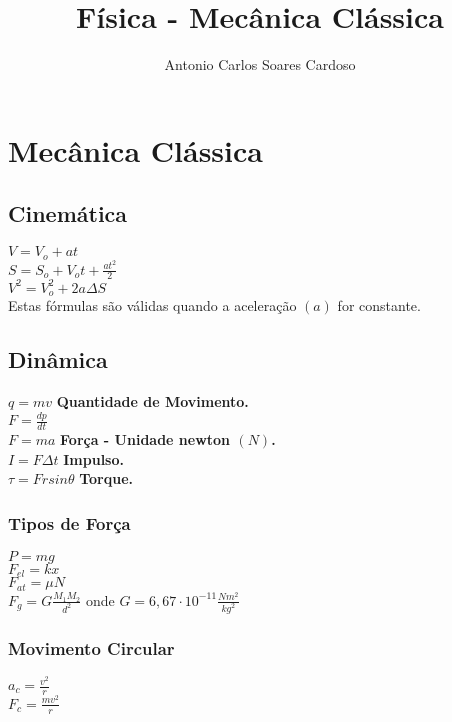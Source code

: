 \documentclass[
    12pt, %
    openright,
    twoside, %
    a4paper, %
    article,
    english,brazil %
]{abntex2}
\author{Antonio Carlos Soares Cardoso}
\title{Física - Mecânica Clássica}
\makeatletter
\renewcommand\tableofcontents{%
  \null\hfill\textbf{\Large\contentsname}\hfill\null\par
  \@mkboth{\MakeUppercase\contentsname}{\MakeUppercase\contentsname}%
  \@starttoc{toc}%
}
\makeatother
\begin{document}
\tableofcontents

\newpage

\textual

\noindent

\chapter{Mecânica Clássica} 

\section{Cinemática}

$V = V_o + at$ \\
$S = S_o + V_ot + \frac{at^2}{2}$ \\
$V^2 = V_o^2 + 2a\Delta S$ \\

Estas fórmulas são válidas quando a aceleração $(a)$ for constante.

\section{Dinâmica}

$q = mv$ \quad \textbf{Quantidade de Movimento.} \\
$F = \frac{dp}{dt}$ \\
$F = ma$ \quad \textbf{Força - Unidade newton $(N)$.} \\
$I = F\Delta t$ \quad \textbf{Impulso.} \\
$\tau = Frsin\theta$ \quad \textbf{Torque.} \\

\subsection{Tipos de Força} 

$P = mg$ \\
$F_{el} = kx$ \\
$F_{at} = \mu N$ \\
$F_{g} = G\frac{M_1M_2}{d^2}$ onde $G = 6,67 \cdot 10^{-11} \frac{Nm^2}{kg^2}$

\subsection{Movimento Circular}

$a_c = \frac{v^2}{r}$ \\
$F_c = \frac{mv^2}{r}$ \\
\end{document}
